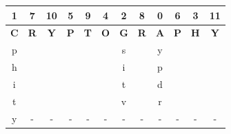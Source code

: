 \documentclass{ashoka-crypto}
\begin{document}
\begin{center}
\begin{tabular}{|c|c|c|c|c|c|c|c|c|c|c|c|}
\hline
1          & 7          & 10         & 5          & 9          & 4          & 2          & 8          & 0          & 6          & 3          & 11         \\ \hline
\textbf{C} & \textbf{R} & \textbf{Y} & \textbf{P} & \textbf{T} & \textbf{O} & \textbf{G} & \textbf{R} & \textbf{A} & \textbf{P} & \textbf{H} & \textbf{Y} \\ \hline
p          &            &            &            &            &            & s          &            & y          &            &            &            \\ \hline
h          &            &            &            &            &            & i          &            & p          &            &            &            \\ \hline
i          &            &            &            &            &            & t          &            & d          &            &            &            \\ \hline
t          &            &            &            &            &            & v          &            & r          &            &            &            \\ \hline
y          &     -       &    -        &      -     &     -       &      -      &     -       &     -       &      -      &     -       &       -     &  -            \\ \hline
\end{tabular}
\end{center}
\end{document}
